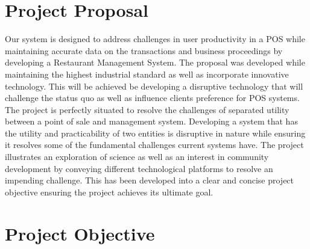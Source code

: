 \section{Project Proposal}

Our system is designed to address challenges in user productivity in a POS while maintaining accurate data on the transactions and business proceedings by developing a Restaurant Management System. The proposal was developed while maintaining the highest industrial standard as well as incorporate innovative technology.  This will be achieved be developing a disruptive technology that will challenge the status quo as well as influence clients preference for POS systems. 
\newline
\newline
The project is perfectly situated to resolve the challenges of separated utility between a point of sale and management system. Developing a system that has the utility and practicability of two entities is disruptive in nature while ensuring it resolves some of the fundamental challenges current systems have. The project illustrates an exploration of science as well as an interest in community development by conveying different technological platforms to resolve an impending challenge. This has been developed into a clear and concise project objective ensuring the project achieves its ultimate goal. 


\section{Project Objective}

